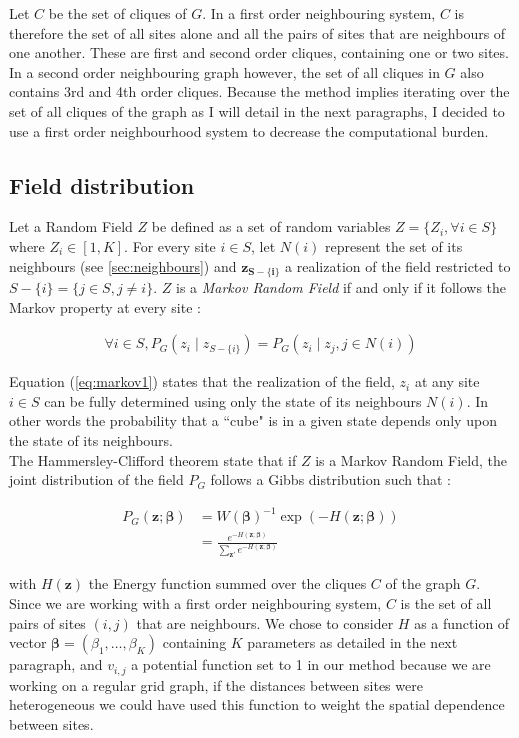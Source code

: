 	Let $C$ be the set of cliques of $G$. In a first order neighbouring system, $C$ is therefore the set of all sites alone and all the pairs of sites that are neighbours of one another. These are first and second order cliques, containing one or two sites. In a second order neighbouring graph however, the set of all cliques in $G$ also contains 3rd and 4th order cliques. Because the method implies iterating over the set of all cliques of the graph as I will detail in the next paragraphs, I decided to use a first order neighbourhood system to decrease the computational burden.


	\subsection{Field distribution}
Let a Random Field $Z$ be defined as a set of random variables $Z = \{Z_i , \forall i \in S\}$ where $Z_i \in [1,K]$. For every site $i \in S$, let $N(i)$ represent the set of its neighbours (see \ref{sec:neighbours}) and $\boldsymbol{z_{S-\{i\}}}$ a realization of the field restricted to $S-\{i\} = \{j \in S, j \neq i\}$. $Z$ is a \emph{Markov Random Field} if and only if it follows the Markov property at every site :

\begin{align}
\label{eq:markov1}
\forall i \in S, P_G (z_i \mid z_{S-\{i\}}) = P_G (z_i \mid z_j , j \in N(i))
\end{align}

Equation (\ref{eq:markov1}) states that the realization of the field, $z_{i}$ at any site $i \in S$ can be fully determined using only the state of its neighbours $N(i)$. In other words the probability that a ``cube" is in a given state depends only upon the state of its neighbours.\\

The Hammersley-Clifford theorem state that if $Z$ is a Markov Random Field, the joint distribution of the field $P_G$ follows a Gibbs distribution such that :

\begin{align}
\label{eq:prior}
P_G (\boldsymbol{z;\beta}) &= W(\boldsymbol{\beta})^{-1} \exp{(-H(\boldsymbol{z;\beta}))} \nonumber\\
&= \frac{e^{-H(\boldsymbol{z;\beta})}}{\sum\limits_{\boldsymbol{z'}} e^{-H(\boldsymbol{z;\beta})}}
\end{align}

with $H(\boldsymbol{z})$ the Energy function summed over the cliques $C$ of the graph $G$. Since we are working with a first order neighbouring system, $C$ is the set of all pairs of sites $(i,j)$ that are neighbours. We chose to consider $H$ as a function of vector $\boldsymbol{\beta} = (\beta_1, \hdots, \beta_K)$ containing $K$ parameters as detailed in the next paragraph, and $v_{i,j}$ a potential function set to 1 in our method because we are working on a regular grid graph,  if the distances between sites were heterogeneous we could have used this function to weight the spatial dependence between sites. 

